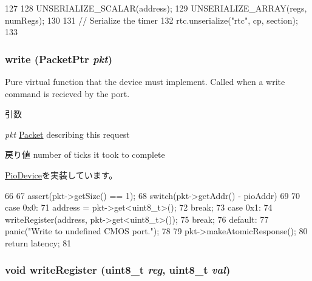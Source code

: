 \begin{DoxyCode}
127 {
128     UNSERIALIZE_SCALAR(address);
129     UNSERIALIZE_ARRAY(regs, numRegs);
130 
131     // Serialize the timer
132     rtc.unserialize("rtc", cp, section);
133 }
\end{DoxyCode}
\hypertarget{classX86ISA_1_1Cmos_a4cefab464e72b5dd42c003a0a4341802}{
\subsubsection[{write}]{ write ({\bf PacketPtr} {\em pkt})}}
\label{classX86ISA_1_1Cmos_a4cefab464e72b5dd42c003a0a4341802}
Pure virtual function that the device must implement. Called when a write command is recieved by the port. 
\begin{DoxyParams}{引数}
\item[{\em pkt}]\hyperlink{classPacket}{Packet} describing this request \end{DoxyParams}
\begin{DoxyReturn}{戻り値}
number of ticks it took to complete 
\end{DoxyReturn}


\hyperlink{classPioDevice_afe8371668d023bb2516b286e5e399b6f}{PioDevice}を実装しています。


\begin{DoxyCode}
66 {
67     assert(pkt->getSize() == 1);
68     switch(pkt->getAddr() - pioAddr)
69     {
70       case 0x0:
71         address = pkt->get<uint8_t>();
72         break;
73       case 0x1:
74         writeRegister(address, pkt->get<uint8_t>());
75         break;
76       default:
77         panic("Write to undefined CMOS port.\n");
78     }
79     pkt->makeAtomicResponse();
80     return latency;
81 }
\end{DoxyCode}
\hypertarget{classX86ISA_1_1Cmos_aad1a7f357917d79e46039f8a7875055a}{
\subsubsection[{writeRegister}]{\setlength{\rightskip}{0pt plus 5cm}void writeRegister (uint8\_\-t {\em reg}, \/  uint8\_\-t {\em val})}}
\label{classX86ISA_1_1Cmos_aad1a7f357917d79e46039f8a7875055a}



